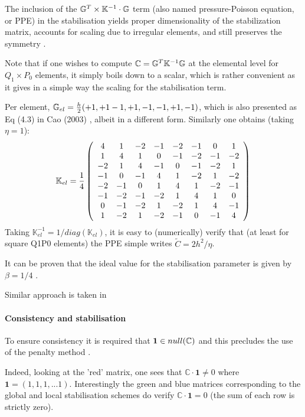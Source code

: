 The inclusion of the ${\mathbb{G}}^T\times {\mathbb{K}}^{-1} \cdot {\mathbb{G}}$
term (also named pressure-Poisson equation, or PPE) in the stabilisation yields proper 
dimensionality of the stabilization matrix,
accounts for scaling due to irregular elements, and still preserves the symmetry \cite{chri02}.

Note that if one wishes to compute ${\mathbb{C}}=\mathbb{G}^T \mathbb{K}^{-1} \mathbb{G}$
at the elemental level for $Q_1\times P_0$ elements, it simply boils down to a scalar,
which is rather convenient as it gives in a simple way the scaling for the
stabilisation term.

Per element, ${\mathbb{G}}_{el}=\frac{h}{2}(+1,+1-1,+1,-1,-1,+1,-1)$, which is also 
presented as Eq (4.3) in Cao (2003) \cite{cao03}, albeit in a different form.
Similarly one obtains (taking $\eta=1$):
\[
{\mathbb{K}}_{el}
=
\frac{1}{4}
\left(
\begin{array}{cccccccc}
4   & 1   & -2 & -1 & -2& -1 &0  & 1\\
1   & 4   & 1  & 0  & -1& -2 &-1 & -2\\
-2  & 1   & 4  & -1 & 0 & -1 &-2 & 1\\
-1  & 0   & -1 & 4  & 1 & -2 &1  & -2\\
-2  & -1  & 0  & 1  & 4 & 1  &-2 & -1\\
-1  & -2  & -1 & -2 & 1 & 4  &1  & 0\\
0   & -1  & -2 & 1  & -2& 1  &4  & -1\\
1   & -2  & 1  & -2 & -1& 0  &-1 & 4 \\
\end{array}
\right)
\]
Taking $\mathbb{K}_{el}^{-1}=1/diag(\mathbb{K}_{el})$, 
it is easy to (numerically) verify that (at least for square Q1P0 elements) 
the PPE simple writes $\tilde{C} = 2 h^2/\eta $.

It can be proven that the ideal value for the stabilisation parameter is given by $\beta=1/4$ \cite[p241]{elsw}.

Similar approach is taken in \cite{chsu97}

\paragraph{Consistency and stabilisation}


To ensure consistency it is required that  ${\bm 1}\in null({\mathbb{C}})$
and this precludes the use of the penalty method \cite[p239]{elsw}.

Indeed, looking at the 'red' matrix, one sees that $\mathbb{C}\cdot {\bm 1} \neq 0$
where ${\bm 1}=(1,1,1,...1)$.
Interestingly the green and blue matrices corresponding to the global and local
stabilisation schemes do verify $\mathbb{C}\cdot {\bm 1} = 0$ (the sum
of each row is strictly zero).

